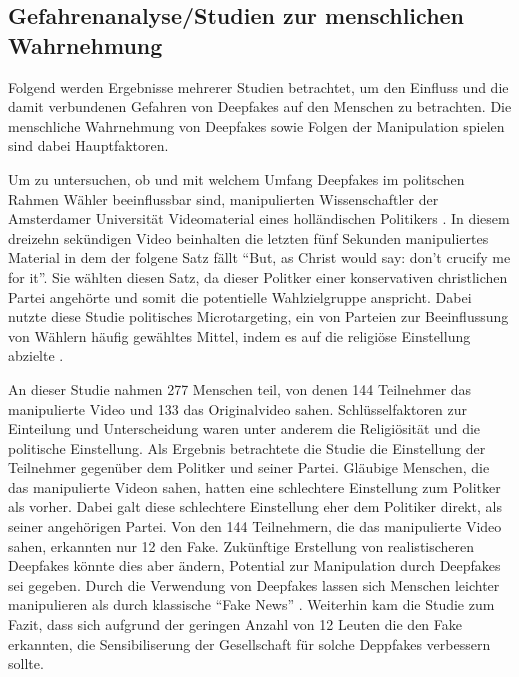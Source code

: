 \subsection{Gefahrenanalyse/Studien zur menschlichen Wahrnehmung}
Folgend werden Ergebnisse mehrerer Studien betrachtet, um den Einfluss und die damit verbundenen Gefahren von Deepfakes auf den Menschen zu betrachten.
Die menschliche Wahrnehmung von Deepfakes sowie Folgen der Manipulation spielen sind dabei Hauptfaktoren.
\par
Um zu untersuchen, ob und mit welchem Umfang Deepfakes im politschen Rahmen Wähler beeinflussbar sind, manipulierten Wissenschaftler der Amsterdamer Universität Videomaterial eines holländischen Politikers \citep[Vgl.][]{Dobber2020}.
In diesem dreizehn sekündigen Video beinhalten die letzten fünf Sekunden manipuliertes Material in dem der folgene Satz fällt ``But, as Christ would say: don’t crucify me for it''.
Sie wählten diesen Satz, da dieser Politker einer konservativen christlichen Partei angehörte und somit die potentielle Wahlzielgruppe anspricht.
Dabei nutzte diese Studie politisches Microtargeting, ein von Parteien zur Beeinflussung von Wählern häufig gewähltes Mittel, indem es auf die religiöse Einstellung abzielte \citep[Vgl.][]{Papakyriakopoulos2017}.
\par
An dieser Studie nahmen 277 Menschen teil, von denen 144 Teilnehmer das manipulierte Video und 133 das Originalvideo sahen.
Schlüsselfaktoren zur Einteilung und Unterscheidung waren unter anderem die Religiösität und die politische Einstellung.
Als Ergebnis betrachtete die Studie die Einstellung der Teilnehmer gegenüber dem Politker und seiner Partei.
Gläubige Menschen, die das manipulierte Videon sahen, hatten eine schlechtere Einstellung zum Politker als vorher.
Dabei galt diese schlechtere Einstellung eher dem Politiker direkt, als seiner angehörigen Partei.
Von den 144 Teilnehmern, die das manipulierte Video sahen, erkannten nur 12 den Fake.
Zukünftige Erstellung von realistischeren Deepfakes könnte dies aber ändern, Potential zur Manipulation durch Deepfakes sei gegeben.
Durch die Verwendung von Deepfakes lassen sich Menschen leichter manipulieren als durch klassische ``Fake News'' \citep[][]{Dobber2020}.
Weiterhin kam die Studie zum Fazit, dass sich aufgrund der geringen Anzahl von 12 Leuten die den Fake erkannten, die Sensibiliserung der Gesellschaft für solche Deppfakes verbessern sollte.
